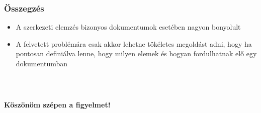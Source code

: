 \documentclass{beamer}
\begin{document}
\begin{frame}[fragile]
\frametitle{Összegzés}

\begin{itemize}
    \item A szerkezeti elemzés bizonyos dokumentumok esetében nagyon bonyolult
    \item A felvetett problémára csak akkor lehetne tökéletes megoldást adni, hogy ha pontosan definiálva lenne, hogy milyen elemek és hogyan fordulhatnak elő egy dokumentumban
\end{itemize}

\end{frame}

\begin{frame}[fragile]
\frametitle{\ }

\begin{center}

    \Large

    \textbf{Köszönöm szépen a figyelmet!}

    \bigskip

\end{center}

\end{frame}
\end{document}
